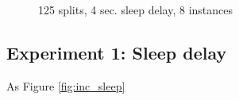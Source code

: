 \documentclass[11pt,a4paper]{article}
\begin{document}
\begin{figure}[htp]
    \centering
    
    \caption{125 splits, 4 sec. sleep delay, 8 instances}
    \label{fig:inc_itr}
\end{figure}


\subsection{Experiment 1: Sleep delay}
As Figure \ref{fig:inc_sleep} 
\end{document}
